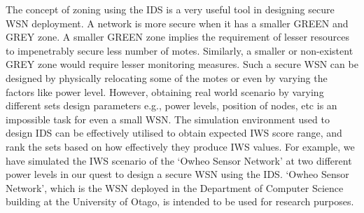 \documentclass[conference,final]{IEEEtran}
\newcommand{\notedme}[1]{\raisebox{0pt}[0pt][0pt]{\pdfcomment[open=true,color=blue]{#1}}}
\begin{document}
The concept of zoning using the IDS is a very useful tool in designing secure WSN deployment.
A network is more secure when it has a smaller GREEN and GREY zone.
A smaller GREEN zone implies the requirement of lesser resources to impenetrably secure less number of motes.
Similarly, a smaller or non-existent GREY zone would require lesser monitoring measures.
Such a secure WSN can be designed by physically relocating some of the motes or even by varying the factors like power level.
However, obtaining real world scenario by varying different sets design parameters e.g., power levels, position of nodes, etc is an impossible task for even a small WSN.
The simulation environment used to design IDS can be effectively utilised to obtain expected IWS score range, and rank the sets based on how effectively they produce IWS values. 
For example, we have simulated the IWS scenario of the `Owheo Sensor Network' at two different power levels in our quest to design a secure WSN using the IDS.
`Owheo Sensor Network', which is the WSN deployed in the Department of Computer Science building at the University of Otago, is intended to be used for research purposes.
\end{document}
